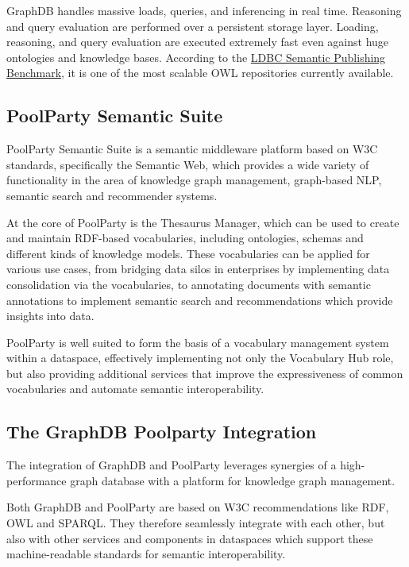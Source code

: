 \documentclass[
  super,
  preprint,
  3p]{elsarticle}
\begin{document}
GraphDB handles massive loads, queries, and inferencing in real time.
Reasoning and query evaluation are performed over a persistent storage
layer. Loading, reasoning, and query evaluation are executed extremely
fast even against huge ontologies and knowledge bases. According to the
\href{https://ldbcouncil.org/benchmarks/spb/}{LDBC Semantic Publishing
Benchmark}, it is one of the most scalable OWL repositories currently
available.

\subsection{PoolParty Semantic Suite}\label{poolparty-semantic-suite}

PoolParty Semantic Suite is a semantic middleware platform based on W3C
standards, specifically the Semantic Web, which provides a wide variety
of functionality in the area of knowledge graph management, graph-based
NLP, semantic search and recommender systems.

At the core of PoolParty is the Thesaurus Manager, which can be used to
create and maintain RDF-based vocabularies, including ontologies,
schemas and different kinds of knowledge models. These vocabularies can
be applied for various use cases, from bridging data silos in
enterprises by implementing data consolidation via the vocabularies, to
annotating documents with semantic annotations to implement semantic
search and recommendations which provide insights into data.

PoolParty is well suited to form the basis of a vocabulary management
system within a dataspace, effectively implementing not only the
Vocabulary Hub role, but also providing additional services that improve
the expressiveness of common vocabularies and automate semantic
interoperability.

\subsection{The GraphDB Poolparty
Integration}\label{the-graphdb-poolparty-integration}

The integration of GraphDB and PoolParty leverages synergies of a
high-performance graph database with a platform for knowledge graph
management.

Both GraphDB and PoolParty are based on W3C recommendations like RDF,
OWL and SPARQL. They therefore seamlessly integrate with each other, but
also with other services and components in dataspaces which support
these machine-readable standards for semantic interoperability.
\end{document}
